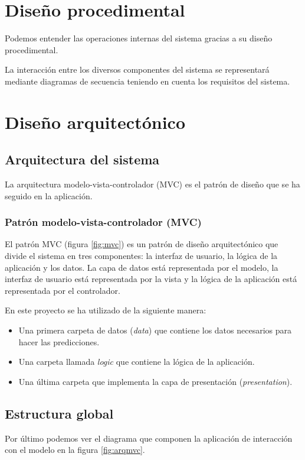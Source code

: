 \section{Diseño procedimental}

Podemos entender las operaciones internas del sistema gracias a su diseño procedimental.

La interacción entre los diversos componentes del sistema se representará mediante diagramas de secuencia teniendo en cuenta los requisitos del sistema.


\section{Diseño arquitectónico}

\subsection{Arquitectura del sistema}

La arquitectura modelo-vista-controlador (MVC) es el patrón de diseño que se ha seguido en la aplicación.

\subsubsection{Patrón modelo-vista-controlador (MVC)}

El patrón MVC (figura \ref{fig:mvc}) es un patrón de diseño arquitectónico que divide el sistema en tres componentes: la interfaz de usuario, la lógica de la aplicación y los datos. La capa de datos está representada por el modelo, la interfaz de usuario está representada por la vista y la lógica de la aplicación está representada por el controlador.


En este proyecto se ha utilizado de la siguiente manera:
\begin{itemize}
    \item Una primera carpeta de datos (\textit{data}) que contiene los datos necesarios para hacer las predicciones.
    \item Una carpeta llamada \textit{logic} que contiene la lógica de la aplicación.
    \item Una última carpeta que implementa la capa de presentación (\textit{presentation}).
\end{itemize}

\subsection{Estructura global}

Por último podemos ver el diagrama que componen la aplicación de interacción con el modelo en la figura \ref{fig:arqmvc}.

